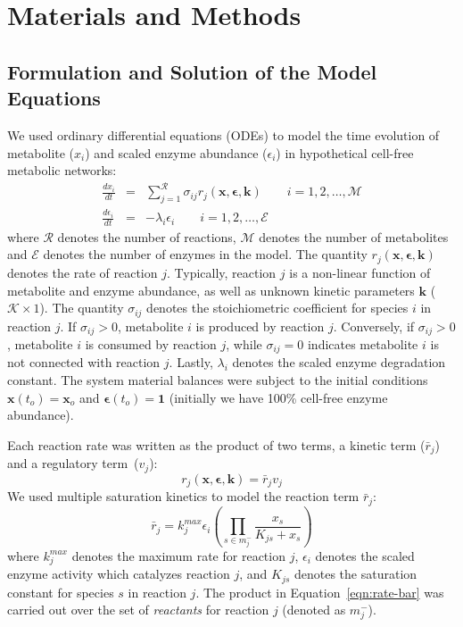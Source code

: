 \documentclass[processes,article,accept,moreauthors,pdftex,12pt,a4paper]{mdpi}
\begin{document}
\section{Materials and Methods}\vspace{-12pt}



\subsection{Formulation and Solution of the Model Equations}


We used ordinary differential equations (ODEs) to model the time evolution of metabolite ($x_{i}$) and scaled enzyme abundance ($\epsilon_{i}$) in hypothetical cell-free metabolic networks:
\begin{eqnarray}
	\frac{dx_{i}}{dt} & = & \sum_{j = 1}^{\mathcal{R}}\sigma_{ij}r_{j}\left(\mathbf{x},\mathbf{\epsilon},\mathbf{k}\right)\qquad{i=1,2,\hdots,\mathcal{M}}\\
	\frac{d\epsilon_{i}}{dt} & = & -\lambda_{i}\epsilon_{i}\qquad{i = 1,2,\hdots,\mathcal{E}}
\end{eqnarray}where $\mathcal{R}$ denotes the number of reactions, $\mathcal{M}$ denotes the number of metabolites and $\mathcal{E}$ denotes the number of enzymes in the model. 
The quantity $r_{j}\left(\mathbf{x},\mathbf{\epsilon},\mathbf{k}\right)$ denotes the rate of reaction $j$. 
Typically, reaction $j$ is a non-linear function of metabolite and enzyme abundance, as well as unknown kinetic parameters $\mathbf{k}$ ($\mathcal{K}\times{1}$). 
The quantity $\sigma_{ij}$ denotes the stoichiometric coefficient for species $i$ in reaction $j$. 
If $\sigma_{ij}>0$, metabolite $i$ is produced by reaction $j$. 
Conversely, if $\sigma_{ij}>0$, metabolite $i$ is consumed by reaction $j$, while $\sigma_{ij} = 0$ indicates metabolite $i$ is not connected with reaction $j$. 
Lastly, $\lambda_{i}$ denotes the scaled enzyme degradation constant. 
The system material balances were subject to the initial conditions $\mathbf{x}\left(t_{o}\right) = \mathbf{x}_{o}$ and $\mathbf{\epsilon}\left(t_{o}\right) = \mathbf{1}$ (initially we have 100\% cell-free enzyme abundance). 

Each reaction rate was written as the product of two terms, a kinetic term ($\bar{r}_{j}$) and a regulatory \mbox{term ($v_{j}$):}
\begin{equation}\label{eqn:rate-factor}
	r_{j}\left(\mathbf{x},\mathbf{\epsilon},\mathbf{k}\right) = \bar{r}_{j}v_{j}
\end{equation}
We used multiple saturation kinetics to model the reaction term $\bar{r}_{j}$:
\begin{equation}\label{eqn:rate-bar}
	\bar{r}_{j} = k_{j}^{max}\epsilon_{i}\left(\prod_{s\in{m_{j}^{-}}}\frac{x_{s}}{K_{js} + x_{s}}\right)
\end{equation}where $k_{j}^{max}$ denotes the maximum rate for reaction $j$, $\epsilon_{i}$ denotes the scaled enzyme activity which catalyzes reaction $j$, and
$K_{js}$ denotes the saturation constant for species $s$ in reaction $j$. 
The product in Equation~\eqref{eqn:rate-bar} was carried out over the set of \textit{reactants} for reaction $j$ (denoted as $m_{j}^{-}$). 
\end{document}
